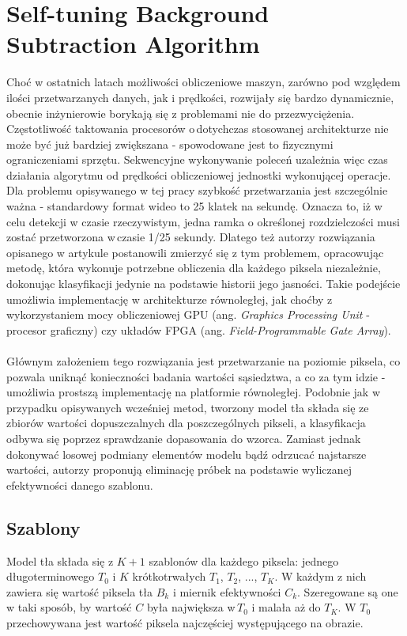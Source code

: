 \section{Self-tuning Background Subtraction Algorithm}
\label{sec:BinWang}
Choć w ostatnich latach możliwości obliczeniowe maszyn, zarówno pod względem ilości przetwarzanych danych, jak i prędkości, rozwijały się bardzo dynamicznie, obecnie inżynierowie borykają się z problemami nie do przezwyciężenia. Częstotliwość taktowania procesorów o\,dotychczas stosowanej architekturze nie może być już bardziej zwiększana - spowodowane jest to fizycznymi ograniczeniami sprzętu. Sekwencyjne wykonywanie poleceń uzależnia więc czas działania algorytmu od prędkości obliczeniowej jednostki wykonującej operacje. Dla problemu opisywanego w tej pracy szybkość przetwarzania jest szczególnie ważna - standardowy format wideo to 25 klatek na sekundę. Oznacza to, iż w celu detekcji w czasie rzeczywistym, jedna ramka o określonej rozdzielczości musi zostać przetworzona w\,czasie 1/25 sekundy. Dlatego też autorzy rozwiązania opisanego w artykule \citep{6910012} postanowili zmierzyć się z tym problemem, opracowując metodę, która wykonuje potrzebne obliczenia dla każdego piksela niezależnie, dokonując klasyfikacji jedynie na podstawie historii jego jasności. Takie podejście umożliwia implementację w architekturze równoległej, jak choćby z wykorzystaniem mocy obliczeniowej GPU (ang. \textit{Graphics Processing Unit} - procesor graficzny) czy układów FPGA (ang. \textit{Field-Programmable Gate Array}).
\paragraph{}
Głównym założeniem tego rozwiązania jest przetwarzanie na poziomie piksela, co pozwala uniknąć konieczności badania wartości sąsiedztwa, a co za tym idzie - umożliwia prostszą implementację na platformie równoległej. Podobnie jak w przypadku opisywanych wcześniej metod, tworzony model tła składa się ze zbiorów wartości dopuszczalnych dla poszczególnych pikseli, a klasyfikacja odbywa się poprzez sprawdzanie dopasowania do wzorca. Zamiast jednak dokonywać losowej podmiany elementów modelu bądź odrzucać najstarsze wartości, autorzy proponują eliminację próbek na podstawie wyliczanej efektywności danego szablonu.
\subsection{Szablony}
Model tła składa się z $K+1$ szablonów dla każdego piksela: jednego długoterminowego $T_{0}$ i $K$ krótkotrwałych $T_{1}$, $T_{2}$, ..., $T_{K}$. W każdym z nich zawiera się wartość piksela tła $B_{k}$ i miernik efektywności $C_{k}$. Szeregowane są one w taki sposób, by wartość $C$ była największa w\,$T_{0}$ i malała aż do $T_{K}$. W $T_{0}$ przechowywana jest wartość piksela najczęściej występującego na obrazie.
